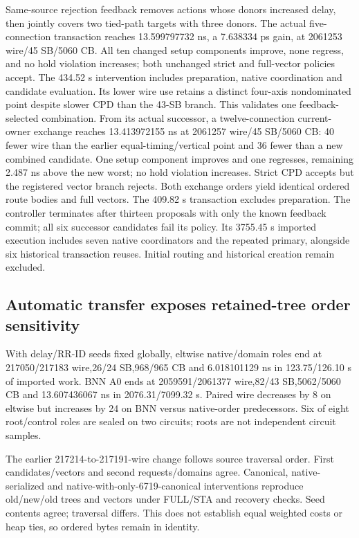 \documentclass[conference,10pt]{IEEEtran}
\begin{document}
Same-source rejection feedback removes actions whose donors increased delay, then jointly covers two tied-path targets with three donors. The actual five-connection transaction reaches 13.599797732 ns, a 7.638334 ps gain, at 2061253 wire/45 SB/5060 CB. All ten changed setup components improve, none regress, and no hold violation increases; both unchanged strict and full-vector policies accept. The 434.52 s intervention includes preparation, native coordination and candidate evaluation. Its lower wire use retains a distinct four-axis nondominated point despite slower CPD than the 43-SB branch. This validates one feedback-selected combination. From its actual successor, a twelve-connection current-owner exchange reaches 13.413972155 ns at 2061257 wire/45 SB/5060 CB: 40 fewer wire than the earlier equal-timing/vertical point and 36 fewer than a new combined candidate. One setup component improves and one regresses, remaining 2.487 ns above the new worst; no hold violation increases. Strict CPD accepts but the registered vector branch rejects. Both exchange orders yield identical ordered route bodies and full vectors. The 409.82 s transaction excludes preparation. The controller terminates after thirteen proposals with only the known feedback commit; all six successor candidates fail its policy. Its 3755.45 s imported execution includes seven native coordinators and the repeated primary, alongside six historical transaction reuses. Initial routing and historical creation remain excluded.

\subsection{Automatic transfer exposes retained-tree order sensitivity}
With delay/RR-ID seeds fixed globally, eltwise native/domain roles end at 217050/217183 wire,26/24 SB,968/965 CB and 6.018101129 ns in 123.75/126.10 s of imported work. BNN A0 ends at 2059591/2061377 wire,82/43 SB,5062/5060 CB and 13.607436067 ns in 2076.31/7099.32 s. Paired wire decreases by 8 on eltwise but increases by 24 on BNN versus native-order predecessors. Six of eight root/control roles are sealed on two circuits; roots are not independent circuit samples.

The earlier 217214-to-217191-wire change follows source traversal order. First candidates/vectors and second requests/domains agree. Canonical, native-serialized and native-with-only-6719-canonical interventions reproduce old/new/old trees and vectors under FULL/STA and recovery checks. Seed contents agree; traversal differs. This does not establish equal weighted costs or heap ties, so ordered bytes remain in identity.
\end{document}
